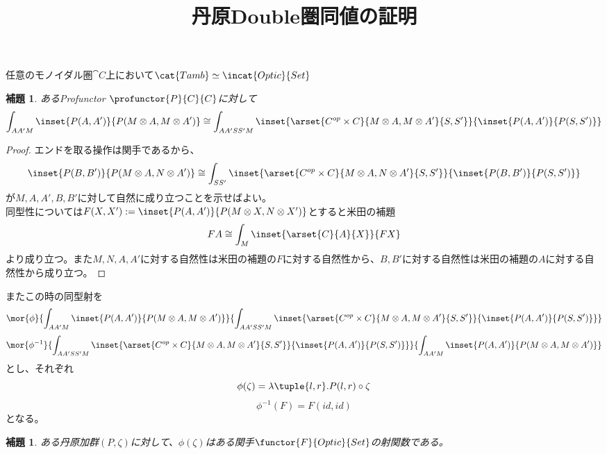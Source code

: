 \documentclass[uplatex,dvipdfmx]{jsarticle}
\newtheorem{lemma}[proof]{補題}
\begin{document}
  \title{丹原Double圏同値の証明}
  \maketitle
  \pagebreak
  \begin{prop}[丹原Double圏同値]
    任意のモノイダル圏$\cat{C}$上において$\cat{Tamb}\simeq\incat{Optic}{Set}$
  \end{prop}
  \begin{lemma}あるProfunctor $\profunctor{P}{C}{C}$に対して
    \[\int_{AA'M}\inset{P(A,A')}{P(M\otimes A,M\otimes A')}\cong\int_{AA'SS'M}\inset{\arset{C^{op}\times C}{M\otimes A, M\otimes A'}{S,S'}}{\inset{P(A,A')}{P(S,S')}}\]
  \end{lemma}
  \begin{proof}
    エンドを取る操作は関手であるから、
    \[\inset{P(B,B')}{P(M\otimes A,N\otimes A')}\cong\int_{SS'}\inset{\arset{C^{op}\times C}{M\otimes A, N\otimes A'}{S,S'}}{\inset{P(B,B')}{P(S,S')}}\]が$M,A,A',B,B'$に対して自然に成り立つことを示せばよい。\\
    同型性については$F(X,X'):=\inset{P(A,A')}{P(M\otimes X,N\otimes X')}$とすると米田の補題\[FA\cong\int_M \inset{\arset{C}{A}{X}}{FX}\]より成り立つ。また$M,N,A,A'$に対する自然性は米田の補題の$F$に対する自然性から、$B,B'$に対する自然性は米田の補題の$A$に対する自然性から成り立つ。
  \end{proof}
  またこの時の同型射を\[\mor{\phi}{\int_{AA'M}\inset{P(A,A')}{P(M\otimes A,M\otimes A')}}{\int_{AA'SS'M}\inset{\arset{C^{op}\times C}{M\otimes A, M\otimes A'}{S,S'}}{\inset{P(A,A')}{P(S,S')}}}\]\[\mor{\phi^{-1}}{\int_{AA'SS'M}\inset{\arset{C^{op}\times C}{M\otimes A, M\otimes A'}{S,S'}}{\inset{P(A,A')}{P(S,S')}}}{\int_{AA'M}\inset{P(A,A')}{P(M\otimes A,M\otimes A')}}\]とし、それぞれ\[\phi(\zeta) = \lambda\tuple{l,r}.P(l,r)\circ \zeta\]
  \[\phi^{-1}(F) = F(id,id)\]となる。
  \begin{lemma}\label{lemma-tamb-is-functor}
    ある丹原加群$(P,\zeta)$に対して、$\phi(\zeta)$はある関手$\functor{F}{Optic}{Set}$の射関数である。
  \end{lemma}
\end{document}
